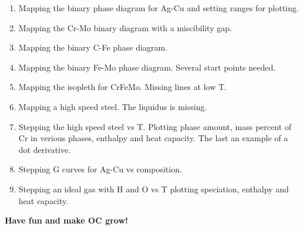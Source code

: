 \documentclass[12pt]{article}
\begin{document}
\begin{enumerate}
\item Mapping the binary phase diagram for Ag-Cu and setting ranges
  for plotting.

\item Mapping the Cr-Mo binary diagram with a miscibility gap.

\item Mapping the binary C-Fe phase diagram.

\item Mapping the binary Fe-Mo phase diagram.  Several start points
  needed.

\item Mapping the isopleth for CrFeMo.  Missing lines at low T.

\item Mapping a high speed steel.  The liquidus is missing.

\item Stepping the high speed steel vs T.  Plotting phase amount,
mass percent of Cr in verious phases, enthalpy and heat capacity.
The last an example of a dot derivative.

\item Stepping G curves for Ag-Cu vs composition.

\item Stepping an ideal gas with H and O vs T plotting speciation,
enthalpy and heat capacity.

\end{enumerate}

{\large \bf Have fun and make OC grow!}
\end{document}
